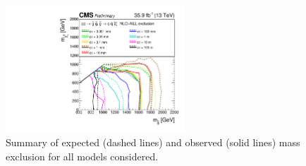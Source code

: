 \newpage
\begin{figure}[h!]
    \begin{center}
    \includegraphics[width=0.6\textwidth]{figures/LLPResults/T1qqqqLL_summary}
    \caption{Summary of expected (dashed lines) and observed (solid lines) mass exclusion
        for all \ctau models considered.}
    \label{fig:T1qqqqLL:ctau-all}
    \end{center}
\end{figure}
